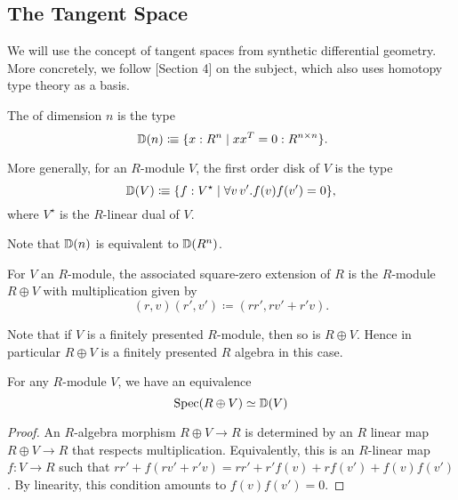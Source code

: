 \subsection{The Tangent Space}

We will use the concept of tangent spaces from synthetic differential geometry.
More concretely, we follow \cite{david-orbifolds}[Section 4]
on the subject, which also uses homotopy type theory as a basis.

\begin{definition}
  The  of dimension $n$ is the type
  \[ \D(n)\colonequiv \{x:R^n \mid xx^T = 0 : R^{n \times n}\}\rlap{.}\]

  More generally, for an $R$-module $V$, the first order disk of $V$ is the type
  \[ \mathbb{D}(V) \vcentcolon\mspace{-1.2mu}\equiv \{ f : V^\star \mid \forall v\,v'. f(v)f(v') = 0 \}, \]
  where $V^\star$ is the $R$-linear dual of $V$.
\end{definition}

Note that $\mathbb{D}(n)$ is equivalent to $\mathbb{D}(R^n)$.

\begin{definition}
  For $V$ an $R$-module, the associated square-zero extension of $R$ is the
  $R$-module $R \oplus V$ with multiplication given by
  \[ (r,v)(r',v') \coloneqq (rr', rv' + r'v).\]
\end{definition}
Note that if $V$ is a finitely presented $R$-module, then so is $R \oplus V$.
Hence in particular $R \oplus V$ is a finitely presented $R$ algebra in this case.

\begin{lemma}
  For any $R$-module $V$, we have an equivalence
  \[ \operatorname{Spec}(R \oplus V) \simeq \mathbb{D}(V)\]
\end{lemma}
\begin{proof}
An $R$-algebra morphism $R \oplus V \to R$ is determined by an $R$ linear map
$R \oplus V \to R$ that respects multiplication. Equivalently, this is an $R$-linear map
$f : V \to R$ such that $rr' + f(rv'+r'v) = rr' + r'f(v) + rf(v') + f(v)f(v')$.
By linearity, this condition amounts to $f(v) f(v') = 0$.
\end{proof}

